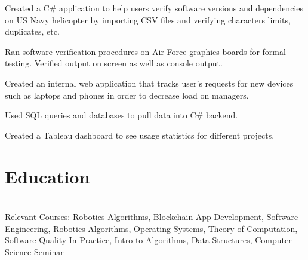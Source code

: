\documentclass[]{deedy-resume-openfont}
\begin{document}
\sectionsep
{}\hfill {}
\begin{tightemize}
	\item Created a C\# application to help users verify software versions and dependencies on US Navy helicopter by importing CSV files and verifying characters limits, duplicates, etc.
	\item Ran software verification procedures on Air Force graphics boards for formal testing. Verified output on screen as well as console output.
\end{tightemize}
\sectionsep
{}\hfill {}
\begin{tightemize}
	\item Created an internal web application that tracks user’s requests for new devices such as laptops and phones in order to decrease load on managers.
	\item Used SQL queries and databases to pull data into C\# backend.
	\item Created a Tableau dashboard to see usage statistics for different projects.
\end{tightemize}
\sectionsep
\hrulefill
%
%
\section{Education}
\raggedright

\hfill {}\\
Relevant Courses: Robotics Algorithms, Blockchain App Development, Software Engineering, Robotics Algorithms, Operating Systems, Theory of Computation, Software Quality In Practice, Intro to Algorithms, Data Structures, Computer Science Seminar 
\sectionsep \\

\hfill {}\\
\sectionsep
\hrulefill
%
%
\end{document}
